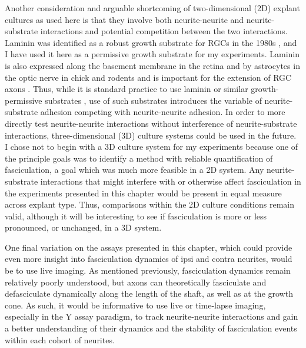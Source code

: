 Another consideration and arguable shortcoming of two-dimensional (2D) explant cultures as used here is that they involve both neurite-neurite and neurite-substrate interactions and potential competition between the two interactions.
Laminin was identified as a robust growth substrate for RGCs \invitro{} in the 1980s \cite{smalheiser1984laminin,cohen1985retinal}, and I have used it here as a permissive growth substrate for my experiments.
Laminin is also expressed along the basement membrane in the retina and by astrocytes in the optic nerve in chick and rodents and is important for the extension of RGC axons \invivo{} \cite{cohen1987role,liesi1988astrocyte,sarthy1990localization,morissette1995laminin}.
Thus, while it is standard practice to use laminin or similar growth-permissive substrates \invitro{}, use of such substrates introduces the variable of neurite-substrate adhesion competing with neurite-neurite adhesion.
In order to more directly test neurite-neurite interactions without interference of neurite-substrate interactions, three-dimensional (3D) culture systems could be used in the future.
I chose not to begin with a 3D culture system for my experiments because one of the principle goals was to identify a method with reliable quantification of fasciculation, a goal which was much more feasible in a 2D system.
Any neurite-substrate interactions that might interfere with or otherwise affect fasciculation in the experiments presented in this chapter would be present in equal measure across explant type.
Thus, comparisons within the 2D culture conditions remain valid, although it will be interesting to see if fasciculation is more or less pronounced, or unchanged, in a 3D system.

One final variation on the assays presented in this chapter, which could provide even more insight into fasciculation dynamics of ipsi and contra neurites, would be to use live imaging.
As mentioned previously, fasciculation dynamics remain relatively poorly understood, but axons can theoretically fasciculate and defasciculate dynamically along the length of the shaft, as well as at the growth cone.
As such, it would be informative to use live or time-lapse imaging, especially in the Y assay paradigm, to track neurite-neurite interactions and gain a better understanding of their dynamics and the stability of fasciculation events within each cohort of neurites.
